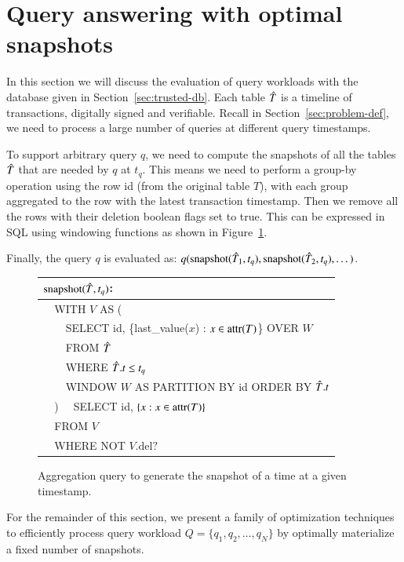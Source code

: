 \section{Query answering with optimal snapshots}

In this section we will discuss the evaluation of query workloads with the
database given in Section~\ref{sec:trusted-db}.  Each table $\Hat T$ is a timeline of
transactions, digitally signed and verifiable.  Recall in
Section~\ref{sec:problem-def}, we need to process a large number of queries at
different query timestamps.

To support arbitrary query $q$, we need to compute the snapshots of all the tables
$\Hat{T}$ that are needed by $q$ at $t_q$. This means we need to perform
a group-by operation using the row id (from the original table $T$), with each
group aggregated to the
row with the latest transaction timestamp.  Then we remove all the rows with
their deletion boolean flags set to true.
This can be expressed in SQL using windowing functions as shown in
Figure~\ref{fig:sql}.

Finally, the query $q$ is evaluated as:
$q(\mathrm{snapshot}(\Hat T_1, t_q), \mathrm{snapshot}(\Hat T_2, t_q), \dots)$.

\begin{figure}[h]
\centering
\begin{tabular}{l} \hline \hline
$\mathrm{snapshot}(\Hat T, t_q)$: \\ \hline
\verb|  |WITH $V$ AS ( \\
\verb|    |SELECT id, \{last\_value($x$) : $x\in\mathrm{attr}(T)$\} OVER $W$ \\
\verb|    |FROM $\Hat T$ \\
\verb|    |WHERE $\Hat T.t \leq t_q$ \\
\verb|    |WINDOW $W$ AS PARTITION BY id ORDER BY $\Hat T.t$ \\
\verb|  |)
\verb|  |SELECT id, $\{x: x\in\mathrm{attr}(T)\}$ \\
\verb|  |FROM $V$ \\
\verb|  |WHERE NOT $V.\mathrm{del?}$ \\ \hline \hline
\end{tabular}
\caption{Aggregation query to generate the snapshot of a time at a given
timestamp.}
\label{fig:sql}
\end{figure}

For the remainder of this section, we present a family of optimization
techniques to efficiently process query workload $Q = \{q_1, q_2, \dots, q_N\}$
by optimally materialize a fixed number of snapshots.

